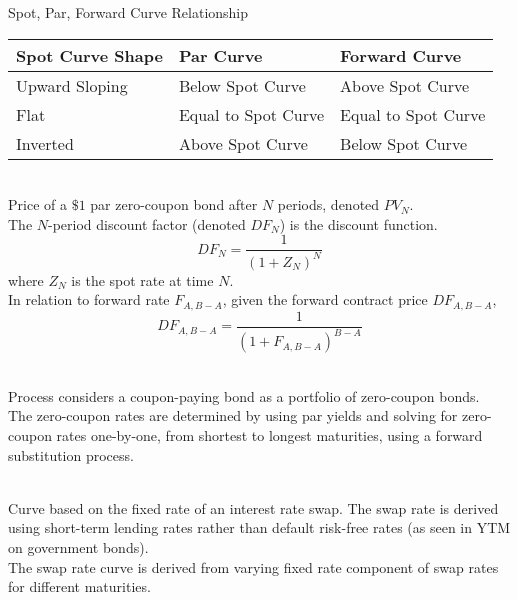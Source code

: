 \begin{flushleft}
Spot, Par, Forward Curve Relationship
\begin{tabularx}{\textwidth}{X|X|X}
\hline
\rowcolor{gray!30}
Spot Curve Shape & Par Curve & Forward Curve \\
\hline
Upward Sloping & Below Spot Curve & Above Spot Curve \\
\hline
Flat & Equal to Spot Curve & Equal to Spot Curve \\
\hline
Inverted & Above Spot Curve & Below Spot Curve \\
\hline
\end{tabularx}
\end{flushleft}

\begin{definition} \\
Price of a $\$1$ par zero-coupon bond after $N$ periods, denoted $PV_N$.\\
The $N$-period discount factor (denoted $DF_N$) is the discount function.
\begin{equation}
DF_N = \frac{1}{(1+Z_N)^N} \nonumber
\end{equation}
where $Z_N$ is the spot rate at time $N$.\\
In relation to forward rate $F_{A, B-A}$, given the forward contract price $DF_{A, B-A}$,
\begin{equation}
DF_{A, B-A} = \frac{1}{\left(1 + F_{A, B-A} \right)^{B-A}} \nonumber
\end{equation}
\end{definition}

\begin{method} \\
Process considers a coupon-paying bond as a portfolio of zero-coupon bonds.\\
The zero-coupon rates are determined by using  par yields and solving for zero-coupon rates one-by-one, from shortest to longest maturities, using a forward substitution process.
\end{method}

\begin{definition} \\
Curve based on the fixed rate of an interest rate swap. The swap rate is derived using short-term lending rates rather than default risk-free rates (as seen in YTM on government bonds).\\
The swap rate curve is derived from varying fixed rate component of swap rates for different maturities.
\end{definition}

